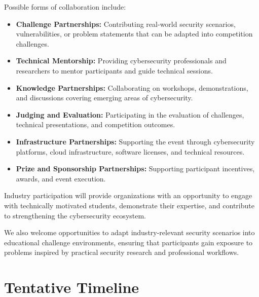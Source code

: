 \documentclass[11pt,a4paper]{article}
\begin{document}
Possible forms of collaboration include:
\begin{itemize}
    \item \textbf{Challenge Partnerships:} Contributing real-world security scenarios,
    vulnerabilities, or problem statements that can be adapted into competition
    challenges.
    \item \textbf{Technical Mentorship:} Providing cybersecurity professionals and
    researchers to mentor participants and guide technical sessions.
    \item \textbf{Knowledge Partnerships:} Collaborating on workshops, demonstrations,
    and discussions covering emerging areas of cybersecurity.
    \item \textbf{Judging and Evaluation:} Participating in the evaluation of challenges,
    technical presentations, and competition outcomes.
    \item \textbf{Infrastructure Partnerships:} Supporting the event through cybersecurity
    platforms, cloud infrastructure, software licenses, and technical resources.
    \item \textbf{Prize and Sponsorship Partnerships:} Supporting participant incentives,
    awards, and event execution.
\end{itemize}

Industry participation will provide organizations with an opportunity to engage with
technically motivated students, demonstrate their expertise, and contribute to
strengthening the cybersecurity ecosystem.

We also welcome opportunities to adapt industry-relevant security scenarios into
educational challenge environments, ensuring that participants gain exposure to
problems inspired by practical security research and professional workflows.

\section{Tentative Timeline}
\end{document}
